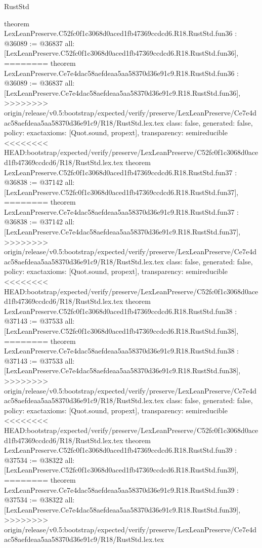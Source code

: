 \begin{lexlean}{RustStd}
\begin{coremodule}
{\begin{coremodule}
{{{{{{{{{{{{{{{{{{{{{{{{{{{{{{{{{{{{{{theorem LexLeanPreserve.C52fc0f1c3068d0aced1fb47369ccdcd6.R18.RustStd.fun36 : @36089 := @36837 {
  all: [LexLeanPreserve.C52fc0f1c3068d0aced1fb47369ccdcd6.R18.RustStd.fun36],
========
theorem LexLeanPreserve.Ce7e4dac58aefdeaa5aa58370d36e91c9.R18.RustStd.fun36 : @36089 := @36837 {
  all: [LexLeanPreserve.Ce7e4dac58aefdeaa5aa58370d36e91c9.R18.RustStd.fun36],
>>>>>>>> origin/release/v0.5:bootstrap/expected/verify/preserve/LexLeanPreserve/Ce7e4dac58aefdeaa5aa58370d36e91c9/R18/RustStd.lex.tex
  class: false,
  generated: false,
  policy: exact{axioms: [Quot.sound, propext]},
  transparency: semireducible
}
<<<<<<<< HEAD:bootstrap/expected/verify/preserve/LexLeanPreserve/C52fc0f1c3068d0aced1fb47369ccdcd6/R18/RustStd.lex.tex
theorem LexLeanPreserve.C52fc0f1c3068d0aced1fb47369ccdcd6.R18.RustStd.fun37 : @36838 := @37142 {
  all: [LexLeanPreserve.C52fc0f1c3068d0aced1fb47369ccdcd6.R18.RustStd.fun37],
========
theorem LexLeanPreserve.Ce7e4dac58aefdeaa5aa58370d36e91c9.R18.RustStd.fun37 : @36838 := @37142 {
  all: [LexLeanPreserve.Ce7e4dac58aefdeaa5aa58370d36e91c9.R18.RustStd.fun37],
>>>>>>>> origin/release/v0.5:bootstrap/expected/verify/preserve/LexLeanPreserve/Ce7e4dac58aefdeaa5aa58370d36e91c9/R18/RustStd.lex.tex
  class: false,
  generated: false,
  policy: exact{axioms: [Quot.sound, propext]},
  transparency: semireducible
}
<<<<<<<< HEAD:bootstrap/expected/verify/preserve/LexLeanPreserve/C52fc0f1c3068d0aced1fb47369ccdcd6/R18/RustStd.lex.tex
theorem LexLeanPreserve.C52fc0f1c3068d0aced1fb47369ccdcd6.R18.RustStd.fun38 : @37143 := @37533 {
  all: [LexLeanPreserve.C52fc0f1c3068d0aced1fb47369ccdcd6.R18.RustStd.fun38],
========
theorem LexLeanPreserve.Ce7e4dac58aefdeaa5aa58370d36e91c9.R18.RustStd.fun38 : @37143 := @37533 {
  all: [LexLeanPreserve.Ce7e4dac58aefdeaa5aa58370d36e91c9.R18.RustStd.fun38],
>>>>>>>> origin/release/v0.5:bootstrap/expected/verify/preserve/LexLeanPreserve/Ce7e4dac58aefdeaa5aa58370d36e91c9/R18/RustStd.lex.tex
  class: false,
  generated: false,
  policy: exact{axioms: [Quot.sound, propext]},
  transparency: semireducible
}
<<<<<<<< HEAD:bootstrap/expected/verify/preserve/LexLeanPreserve/C52fc0f1c3068d0aced1fb47369ccdcd6/R18/RustStd.lex.tex
theorem LexLeanPreserve.C52fc0f1c3068d0aced1fb47369ccdcd6.R18.RustStd.fun39 : @37534 := @38322 {
  all: [LexLeanPreserve.C52fc0f1c3068d0aced1fb47369ccdcd6.R18.RustStd.fun39],
========
theorem LexLeanPreserve.Ce7e4dac58aefdeaa5aa58370d36e91c9.R18.RustStd.fun39 : @37534 := @38322 {
  all: [LexLeanPreserve.Ce7e4dac58aefdeaa5aa58370d36e91c9.R18.RustStd.fun39],
>>>>>>>> origin/release/v0.5:bootstrap/expected/verify/preserve/LexLeanPreserve/Ce7e4dac58aefdeaa5aa58370d36e91c9/R18/RustStd.lex.tex
}}}}}}}}}}}}}}}}}}}}}}}}}}}}}}}}}}}}}}}}}}}
\end{coremodule}}
\end{coremodule}
\end{lexlean}
